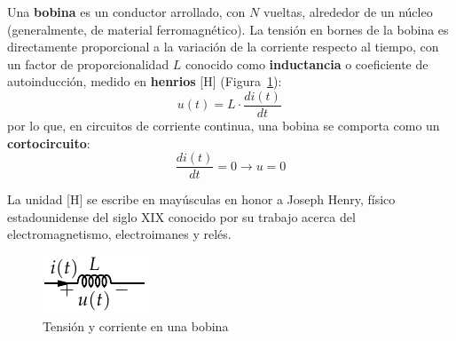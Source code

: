	Una \textbf{bobina} es un conductor arrollado, con $N$
        vueltas, alrededor de un núcleo (generalmente, de material
        ferromagnético). La tensión en bornes de la bobina es
        directamente proporcional a la variación de la corriente
        respecto al tiempo, con un factor de proporcionalidad $L$
        conocido como \textbf{inductancia} o coeficiente de
        autoinducción, medido en \textbf{henrios} [H]
        (Figura~\ref{fig:bobina}):
	\begin{equation}\label{eq:u_L}
          \boxed{u(t)=L\cdot\frac{di(t)}{dt}}\,
	\end{equation}
	por lo que, en circuitos de corriente continua, una bobina se
        comporta como un \textbf{cortocircuito}:
	\begin{equation*}
          \dfrac{di(t)}{dt} = 0 \rightarrow u = 0
	\end{equation*}
	\begin{remark}
          La unidad [H] se escribe en mayúsculas en honor a Joseph
          Henry, físico estadounidense del siglo XIX conocido por su
          trabajo acerca del electromagnetismo, electroimanes y relés.
	\end{remark}
	\begin{figure}[H]
          \centering
          \includegraphics[width=0.15\linewidth]{../figs/Bobina.pdf}
          \caption{Tensión y corriente en una bobina}
          \label{fig:bobina}
	\end{figure}
	
